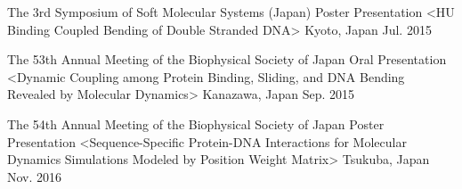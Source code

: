 

\begin{cventries}

  \cventry
    {The 3rd Symposium of Soft Molecular Systems (Japan)} %
    {Poster Presentation <HU Binding Coupled Bending of Double Stranded DNA>} %
    {Kyoto, Japan} %
    {Jul. 2015} %
    {}

  \cventry
    {The 53th Annual Meeting of the Biophysical Society of Japan} %
    {Oral Presentation <Dynamic Coupling among Protein Binding, Sliding, and DNA Bending Revealed by Molecular Dynamics>} %
    {Kanazawa, Japan} %
    {Sep. 2015} %
    {}

  \cventry
    {The 54th Annual Meeting of the Biophysical Society of Japan} %
    {Poster Presentation <Sequence-Specific Protein-DNA Interactions for
      Molecular Dynamics Simulations Modeled by Position Weight Matrix>} %
    {Tsukuba, Japan} %
    {Nov. 2016} %
    {}

\end{cventries}

